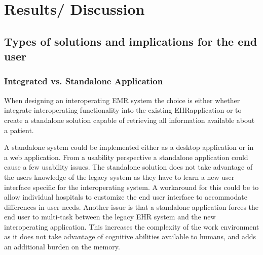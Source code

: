 \documentclass[14pt]{article}
\begin{document}

\newpage

\section{Results/ Discussion}
\label{sec:Results}
\subsection{Types of solutions and implications for the end user}
\label{sec:resultsEndUser}
\subsubsection{Integrated vs. Standalone Application}
When designing an interoperating \gls{EMR} system the choice is either whether integrate interoperating functionality into the existing \gls{EHR}application or to create a standalone solution capable of retrieving all information available about a patient.

A standalone system could be implemented either as a desktop application or in a web application. From a usability perspective a standalone application could cause a few usability issues. The standalone solution does not take advantage of the users knowledge of the legacy system as they have to learn a new user interface specific for the interoperating system. A workaround for this could be to allow individual hospitals to customize the end user interface to accommodate differences in user needs. 
Another issue is that a standalone application forces the end user to multi-task between the legacy \gls{EHR} system and the new interoperating application. This increases the complexity of the work environment as it does not take advantage of cognitive abilities available to humans, and adds an additional burden on the memory. 
\end{document}
